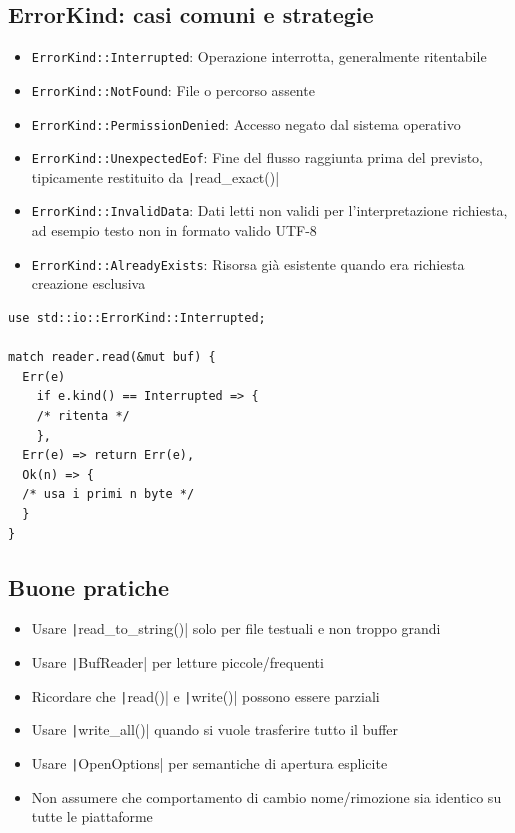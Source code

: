 \begin{flushleft}
  \begin{minipage}{0.63\linewidth}
    \raggedright
    \subsection{ErrorKind: casi comuni e strategie}
    \begin{itemize}
      \item \texttt{ErrorKind::Interrupted}: Operazione interrotta, generalmente ritentabile
      \item \texttt{ErrorKind::NotFound}: File o percorso assente
      \item \texttt{ErrorKind::PermissionDenied}: Accesso negato dal sistema operativo
      \item \texttt{ErrorKind::UnexpectedEof}: Fine del flusso raggiunta prima del previsto, tipicamente restituito da \texttt|read_exact()|
      \item \texttt{ErrorKind::InvalidData}: Dati letti non validi per
            l'interpretazione richiesta, ad esempio testo non in formato valido UTF-8
      \item \texttt{ErrorKind::AlreadyExists}: Risorsa già esistente quando era
            richiesta creazione esclusiva
    \end{itemize}
  \end{minipage}%
  \hfill
  \begin{minipage}{0.4\linewidth}
    \begin{verbatim}
use std::io::ErrorKind::Interrupted;

match reader.read(&mut buf) {
  Err(e)
    if e.kind() == Interrupted => {
    /* ritenta */
    },
  Err(e) => return Err(e),
  Ok(n) => {
  /* usa i primi n byte */
  }
}
    \end{verbatim}
  \end{minipage}
\end{flushleft}


\subsection{Buone pratiche}

\begin{itemize}
  \item Usare \texttt|read_to_string()| solo per file testuali e non troppo grandi
  \item Usare \texttt|BufReader| per letture piccole/frequenti
  \item Ricordare che \texttt|read()| e \texttt|write()| possono essere parziali
  \item Usare \texttt|write_all()| quando si vuole trasferire tutto il buffer
  \item Usare \texttt|OpenOptions| per semantiche di apertura esplicite
  \item Non assumere che comportamento di cambio nome/rimozione sia identico su tutte le piattaforme
\end{itemize}


